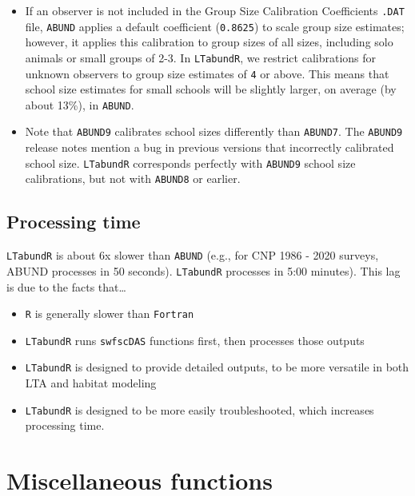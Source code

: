 \documentclass[
]{book}
\begin{document}
\begin{itemize}
\item
  If an observer is not included in the Group Size Calibration Coefficients \texttt{.DAT} file, \texttt{ABUND} applies a default coefficient (\texttt{0.8625}) to scale group size estimates; however, it applies this calibration to group sizes of all sizes, including solo animals or small groups of 2-3. In \texttt{LTabundR}, we restrict calibrations for unknown observers to group size estimates of \texttt{4} or above. This means that school size estimates for small schools will be slightly larger, on average (by about 13\%), in \texttt{ABUND}.
\item
  Note that \texttt{ABUND9} calibrates school sizes differently than \texttt{ABUND7}. The \texttt{ABUND9} release notes mention a bug in previous versions that incorrectly calibrated school size. \texttt{LTabundR} corresponds perfectly with \texttt{ABUND9} school size calibrations, but not with \texttt{ABUND8} or earlier.
\end{itemize}

\hypertarget{processing-time}{%
\section*{Processing time}\label{processing-time}}

\texttt{LTabundR} is about 6x slower than \texttt{ABUND} (e.g., for CNP 1986 - 2020 surveys, ABUND processes in 50 seconds). \texttt{LTabundR} processes in 5:00 minutes). This lag is due to the facts that\ldots{}

\begin{itemize}
\item
  \texttt{R} is generally slower than \texttt{Fortran}
\item
  \texttt{LTabundR} runs \texttt{swfscDAS} functions first, then processes those outputs
\item
  \texttt{LTabundR} is designed to provide detailed outputs, to be more versatile in both LTA and habitat modeling
\item
  \texttt{LTabundR} is designed to be more easily troubleshooted, which increases processing time.
\end{itemize}

\hypertarget{misc_functions}{%
\chapter{Miscellaneous functions}\label{misc_functions}}
\end{document}
